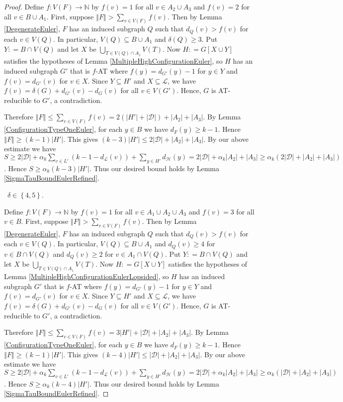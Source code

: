 \documentclass[12pt]{article}
\theoremstyle{plain}
\theoremstyle{definition}
\theoremstyle{remark}
\newcommand{\fancy}[1]{\mathcal{#1}}
\newcommand{\IN}{\mathbb{N}}
\newcommand{\D}{\fancy{D}}
\renewcommand{\L}{\fancy{L}}
\newcommand{\HH}{\fancy{H}}
\newcommand{\set}[1]{\left\{ #1 \right\}}
\newcommand{\card}[1]{\left|#1\right|}
\newcommand{\size}[1]{\left\Vert#1\right\Vert}
\newcommand{\func}[3]{#1\colon #2 \rightarrow #3}
\newcommand{\parens}[1]{\left( #1 \right)}
\newcommand{\DefinedAs}{\mathrel{\mathop:}=}
\def\D{\fancy{D}}
\newcommand{\case}[2]{{\bf Case #1.}~{\it #2}~~}
\begin{document}
\begin{proof}
Define $\func{f}{V(F)}{\IN}$ by $f(v) = 1$ for all $v \in A_2 \cup A_3$ and $f(v) = 2$ for all $v \in B \cup A_1$.  First, suppose $\size{F} > \sum_{v \in V(F)} f(v)$.  Then by Lemma \ref{DegenerateEuler}, $F$ has an induced subgraph $Q$ such that $d_Q(v) > f(v)$ for each $v \in V(Q)$.  In particular, $V(Q) \subseteq B \cup A_1$ and $\delta(Q) \ge 3$.  Put $Y \DefinedAs B \cap V(Q)$ and let $X$ be $\bigcup_{T \in V(Q) \cap A_1} V(T)$. Now $H \DefinedAs G[X \cup Y]$ satisfies the hypotheses of Lemma \ref{MultipleHighConfigurationEuler}, so $H$ has an induced subgraph $G'$ that is $f$-AT where $f(y) = d_{G'}(y) - 1$ for $y \in Y$ and $f(v) = d_{G'}(v)$ for $v \in X$.  Since $Y \subseteq H'$ and $X \subseteq \L$, we have $f(v) = \delta(G) + d_{G'}(v) - d_G(v)$ for all $v \in V(G')$.  Hence, $G$ is AT-reducible to $G'$, a contradiction.

Therefore $\size{F} \leq \sum_{v \in V(F)} f(v) = 2(\card{H'} + \card{\D}) + \card{A_2} + 
\card{A_3}$. By Lemma \ref{ConfigurationTypeOneEuler}, for each $y \in B$ we have $d_F(y) \ge k-1$.  Hence $\size{F} \ge (k-1)\card{H'}$.  This gives $(k-3)\card{H'} \leq 2\card{\D} + \card{A_2} + 
\card{A_3}$.  By our above estimate we have $S \ge 2\card{\D} + \alpha_k\sum_{v \in L'} \parens{k-1 - d_{\L}(v)}  + \sum_{y \in H'} d_{\HH}(y) = 2\card{\D} + \alpha_k\card{A_2} + \card{A_3} \ge \alpha_k(2\card{\D} + \card{A_2} + \card{A_3})$.  Hence $S \ge \alpha_k(k-3)\card{H'}$.  Thus our desired bound holds by Lemma \ref{SigmaTauBoundEulerRefined}.
\bigskip

\noindent \case{2}{$\delta \in \set{4,5}$.}
\smallskip

Define $\func{f}{V(F)}{\IN}$ by $f(v) = 1$ for all $v \in A_1 \cup A_2 \cup A_3$ and $f(v) = 3$ for all $v \in B$.  First, suppose $\size{F} > \sum_{v \in V(F)} f(v)$.  Then by Lemma \ref{DegenerateEuler}, $F$ has an induced subgraph $Q$ such that $d_Q(v) > f(v)$ for each $v \in V(Q)$.  In particular, $V(Q) \subseteq B \cup A_1$ and $d_Q(v) \ge 4$ for $v \in B \cap V(Q)$ and $d_Q(v) \ge 2$ for $v \in A_1 \cap V(Q)$.  Put $Y \DefinedAs B \cap V(Q)$ and let $X$ be $\bigcup_{T \in V(Q) \cap A_1} V(T)$. Now $H \DefinedAs G[X \cup Y]$ satisfies the hypotheses of Lemma \ref{MultipleHighConfigurationEulerLopsided}, so $H$ has an induced subgraph $G'$ that is $f$-AT where $f(y) = d_{G'}(y) - 1$ for $y \in Y$ and $f(v) = d_{G'}(v)$ for $v \in X$.  Since $Y \subseteq H'$ and $X \subseteq \L$, we have $f(v) = \delta(G) + d_{G'}(v) - d_G(v)$ for all $v \in V(G')$.  Hence, $G$ is AT-reducible to $G'$, a contradiction.

Therefore $\size{F} \leq \sum_{v \in V(F)} f(v) = 3\card{H'} + \card{\D} + \card{A_2} + 
\card{A_3}$. By Lemma \ref{ConfigurationTypeOneEuler}, for each $y \in B$ we have $d_F(y) \ge k-1$.  Hence $\size{F} \ge (k-1)\card{H'}$.  This gives $(k-4)\card{H'} \leq \card{\D} + \card{A_2} + 
\card{A_3}$.  By our above estimate we have $S \ge 2\card{\D} + \alpha_k\sum_{v \in L'} \parens{k-1 - d_{\L}(v)}  + \sum_{y \in H'} d_{\HH}(y) = 2\card{\D} + \alpha_k\card{A_2} + \card{A_3} \ge \alpha_k(\card{\D} + \card{A_2} + \card{A_3})$.  Hence $S \ge \alpha_k(k-4)\card{H'}$.  Thus our desired bound holds by Lemma \ref{SigmaTauBoundEulerRefined}.
\end{proof}



\end{document}
